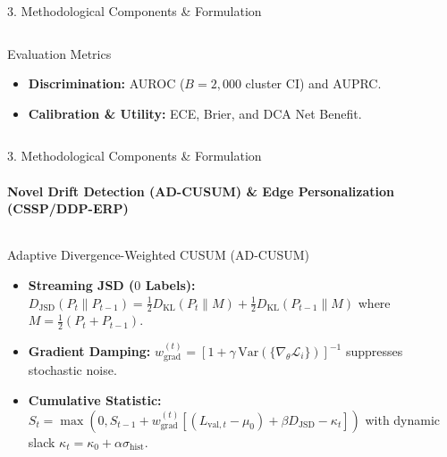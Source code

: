 \documentclass[aspectratio=169, 11pt]{beamer}
\begin{document}
\begin{frame}{3. Methodological Components \& Formulation}
\begin{columns}[T]
        \begin{block}{Evaluation Metrics}
            \scriptsize
            \begin{itemize}
                \item \textbf{Discrimination:} AUROC ($B=2,000$ cluster CI) and AUPRC.
                \item \textbf{Calibration \& Utility:} ECE, Brier, and DCA Net Benefit.
            \end{itemize}
        \end{block}
    \end{columns}
\end{frame}

\begin{frame}{3. Methodological Components \& Formulation}
    \framesubtitle{Novel Drift Detection (AD-CUSUM) \& Edge Personalization (CSSP/DDP-ERP)}
    \begin{columns}[T]
        \begin{block}{Adaptive Divergence-Weighted CUSUM (AD-CUSUM)}
            \scriptsize
            \begin{itemize}
                \item \textbf{Streaming JSD ($0$ Labels):}
                $D_{\text{JSD}}(P_t \parallel P_{t-1}) = \frac{1}{2} D_{\text{KL}}(P_t \parallel M) + \frac{1}{2} D_{\text{KL}}(P_{t-1} \parallel M)$
                where $M = \frac{1}{2}(P_t + P_{t-1})$.
                \item \textbf{Gradient Damping:}
                $w_{\text{grad}}^{(t)} = \left[1 + \gamma \, \text{Var}(\{\nabla_\theta \mathcal{L}_i\})\right]^{-1}$ suppresses stochastic noise.
                \item \textbf{Cumulative Statistic:}
                $S_t = \max\left(0, S_{t-1} + w_{\text{grad}}^{(t)} \left[(L_{\text{val},t} - \mu_0) + \beta D_{\text{JSD}} - \kappa_t\right]\right)$
                with dynamic slack $\kappa_t = \kappa_0 + \alpha \sigma_{\text{hist}}$.
            \end{itemize}
        \end{block}


\end{columns}
\end{frame}
\end{document}
